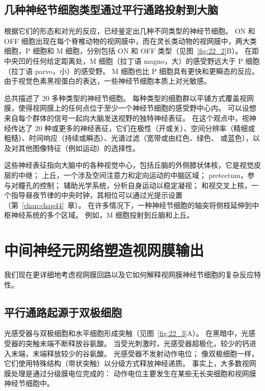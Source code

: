 \subsection{几种神经节细胞类型通过平行通路投射到大脑}

根据它们的形态和对光的反应，已经鉴定出几种不同类型的神经节细胞。
ON 和 OFF 细胞出现在每个脊椎动物的视网膜中，而在灵长类动物的视网膜中，两大类细胞，P 细胞和 M 细胞，分别包括 ON 和 OFF 类型（见图~\ref{fig:22_2}B）。
在距中央凹的任何给定距离处，M 细胞（拉丁语 magno，大）的感受野远大于 P 细胞（拉丁语 parvo，小）的感受野。
M 细胞也比 P 细胞具有更快和更瞬态的反应。
由于视觉色素黑视蛋白的表达，一些神经节细胞本质上对光敏感。


总共描述了 20 多种类型的神经节细胞。
每种类型的细胞群以平铺方式覆盖视网膜，使得视网膜上的任何点位于至少一个神经节细胞的感受野中心内。
可以设想来自每个群体的信号一起向大脑发送视野的独特神经表征。
在这个观点中，视神经传达了 20 种或更多的神经表征，它们在极性（开或关）、空间分辨率（精细或粗糙）、时间响应（持续或瞬态）、光谱过滤（宽带或由红色、绿色、 或蓝色），以及对其他图像特征（例如运动）的选择性。


这些神经表征指向大脑中的各种视觉中心，包括丘脑的外侧膝状体核，它是视觉皮层的中继；
上丘，一个涉及空间注意力和定向运动的中脑区域； pretectum，参与对瞳孔的控制； 
辅助光学系统，分析自身运动以稳定凝视；
和视交叉上核，一个指导昼夜节律的中央时钟，其相位可以通过光提示设置（第~\ref{chap:chap44}~章）。 
在许多情况下，一种神经节细胞的轴突将侧枝延伸到中枢神经系统的多个区域。
例如，M 细胞投射到丘脑和上丘。



\section{中间神经元网络塑造视网膜输出}

我们现在更详细地考虑视网膜回路以及它如何解释视网膜神经节细胞的复杂反应特性。



\subsection{平行通路起源于双极细胞}

光感受器与双极细胞和水平细胞形成突触（见图~\ref{fig:22_3}A）。
在黑暗中，光感受器的突触末端不断释放谷氨酸。
当受光刺激时，光感受器超极化，较少的钙进入末端，末端释放较少的谷氨酸。
光感受器不发射动作电位；
像双极细胞一样，它们使用特殊结构（带状突触）以分级方式释放神经递质。
事实上，大多数视网膜处理是通过分级膜电位完成的：
动作电位主要发生在某些无长突细胞和视网膜神经节细胞中。


